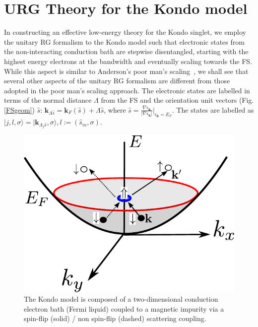 \documentclass[aps,prl,preprint,groupedaddress]{revtex4-2}
\begin{document}
\section{URG Theory for the Kondo model}
\par\noindent
In constructing an effective low-energy theory for the Kondo singlet, we employ the unitary RG formalism to the Kondo model such that electronic states from the non-interacting conduction bath are stepwise disentangled, starting with the highest energy electrons at the bandwidth and eventually scaling towards the FS. While this aspect is similar to Anderson's poor man's scaling~\cite{anderson1970poor}, we shall see that several other aspects of the unitary RG formalism are different from those adopted in the poor man's scaling approach. The electronic states are labelled in terms of the normal distance $\Lambda$ from the FS and the orientation unit vectors (Fig.\ref{FSgeom}) $\hat{s}$: $\mathbf{k}_{\Lambda\hat{s}}=\mathbf{k}_{F}(\hat{s})+\Lambda\hat{s}$, where $\hat{s}=\frac{\nabla\epsilon_{\mathbf{k}}}{|\nabla\epsilon_{\mathbf{k}}|}|_{\epsilon_{\mathbf{k}}=E_{F}}$. The states are labelled as
$|j,l,\sigma\rangle = |\mathbf{k}_{\Lambda_{j}\hat{s}},\sigma\rangle, l:=(\hat{s}_{m},\sigma)$. 
\begin{figure}
\includegraphics[scale=1]{kondoSetup.pdf}
\caption{The Kondo model is composed of a two-dimensional conduction electron bath (Fermi liquid) coupled to a magnetic impurity via a spin-flip (solid) / non spin-flip (dashed) scattering coupling.}
\end{figure}
\end{document}
